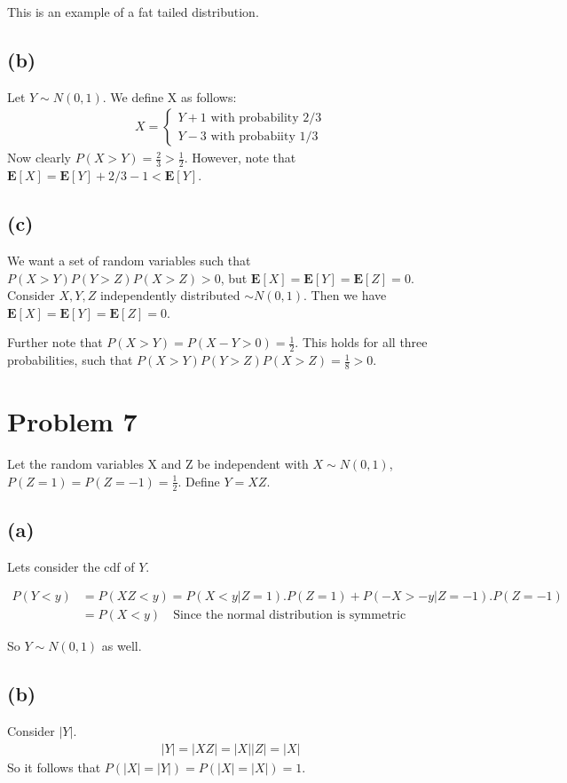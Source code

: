 \documentclass{article}
\begin{document}
	This is an example of a fat tailed distribution.
	
	\subsection*{(b)}
	Let $Y \sim N(0,1)$. We define X as follows:
	\begin{align*}
	X = \begin{cases} Y + 1 \text{ with probability 2/3} \\
	Y - 3 \text{ with probabiity 1/3} \end{cases}
	\end{align*}
	Now clearly $P(X > Y) = \frac{2}{3} > \frac{1}{2}$. However, note that $\mathbf{E}[X] = \mathbf{E}[Y] + 2/3 - 1 < \mathbf{E}[Y]$. 
	
	
	\subsection*{(c)}
	We want a set of random variables such that $P(X > Y)P(Y > Z)P(X > Z) > 0$, but $\mathbf{E}[X] = \mathbf{E}[Y] = \mathbf{E}[Z] = 0$. Consider $X,Y,Z$ independently distributed $\sim N(0,1)$. Then we have $\mathbf{E}[X] = \mathbf{E}[Y] = \mathbf{E}[Z] = 0$. 
	
	Further note that $P(X > Y) = P(X - Y > 0) = \frac{1}{2}$. This holds for all three probabilities, such that $P(X > Y)P(Y > Z)P(X > Z) = \frac{1}{8} > 0$. 
	
	\section*{Problem 7}
	Let the random variables X and Z be independent with $X \sim N(0,1)$, $P(Z=1) = P(Z=-1) = \frac{1}{2}$. Define $Y = XZ$. 
	
	\subsection*{(a)}
	Lets consider the cdf of $Y$. 
	
	\begin{align*}
	P(Y < y) &= P(XZ < y) = P(X < y | Z = 1).P(Z=1) + P(- X > - y | Z = -1).P(Z = -1) \\
	&= P(X < y) \quad \text{Since the normal distribution is symmetric}
	\end{align*}
	
	So $Y \sim N(0,1)$ as well.
	
	\subsection*{(b)}
	Consider $|Y|$.
	\begin{align*}
	|Y| = |XZ| = |X||Z|= |X|
	\end{align*}
	So it follows that $P(|X| = |Y|) = P(|X| = |X|) = 1$.
	
\end{document}
